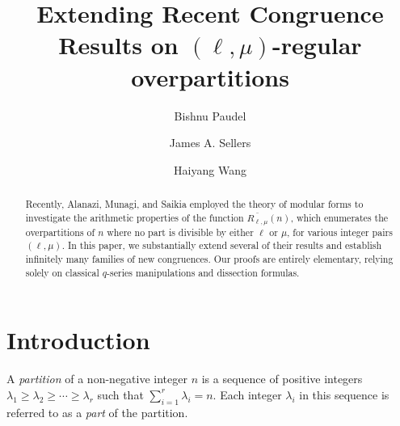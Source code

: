 \documentclass{amsart}
\theoremstyle{definition}
\begin{document}
\title[Extending Recent Congruence Results on $(\ell,\mu)$-regular overpartitions]{Extending Recent Congruence Results on $(\ell,\mu)$-regular overpartitions}%

\author[B. Paudel]{Bishnu Paudel}

\author[J. Sellers]{James A. Sellers}

\author[H. Wang]{Haiyang Wang}

\address{Mathematics and Statistics Department\\
         University of Minnesota Duluth\\
         Duluth, MN 55812, USA}
\begin{abstract}
	Recently, Alanazi, Munagi, and Saikia employed the theory of modular forms to investigate the arithmetic properties of the function $\overline{R_{\ell,\mu}}(n)$, which enumerates the overpartitions of $n$ where no part is divisible by either $\ell$ or $\mu$, for various integer pairs $(\ell, \mu)$. In this paper, we substantially extend several of their results and establish infinitely many families of new congruences. Our proofs are entirely elementary, relying solely on classical $q$-series manipulations and dissection formulas.		
\end{abstract}			
		
\maketitle
\section{Introduction}
A \textit{partition} of a non-negative integer $n$ is a sequence of positive integers $\lambda_1 \geq \lambda_2 \geq \cdots \geq \lambda_r$ such that $\sum_{i=1}^r \lambda_i = n$. Each integer $\lambda_i$ in this sequence is referred to as a \textit{part} of the partition.
\end{document}
